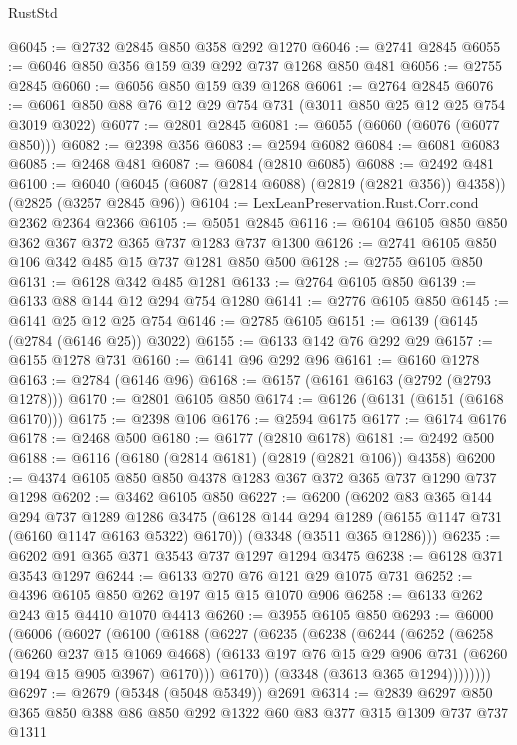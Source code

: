 \begin{lexlean}{RustStd}
\begin{coremodule}
@6045 := @2732 @2845 @850 @358 @292 @1270
@6046 := @2741 @2845
@6055 := @6046 @850 @356 @159 @39 @292 @737 @1268 @850 @481
@6056 := @2755 @2845
@6060 := @6056 @850 @159 @39 @1268
@6061 := @2764 @2845
@6076 := @6061 @850 @88 @76 @12 @29 @754 @731 (@3011 @850 @25 @12 @25 @754 @3019 @3022)
@6077 := @2801 @2845
@6081 := @6055 (@6060 (@6076 (@6077 @850)))
@6082 := @2398 @356
@6083 := @2594 @6082
@6084 := @6081 @6083
@6085 := @2468 @481
@6087 := @6084 (@2810 @6085)
@6088 := @2492 @481
@6100 := @6040 (@6045 (@6087 (@2814 @6088) (@2819 (@2821 @356)) @4358)) (@2825 (@3257 @2845 @96))
@6104 := LexLeanPreservation.Rust.Corr.cond @2362 @2364 @2366
@6105 := @5051 @2845
@6116 := @6104 @6105 @850 @850 @362 @367 @372 @365 @737 @1283 @737 @1300
@6126 := @2741 @6105 @850 @106 @342 @485 @15 @737 @1281 @850 @500
@6128 := @2755 @6105 @850
@6131 := @6128 @342 @485 @1281
@6133 := @2764 @6105 @850
@6139 := @6133 @88 @144 @12 @294 @754 @1280
@6141 := @2776 @6105 @850
@6145 := @6141 @25 @12 @25 @754
@6146 := @2785 @6105
@6151 := @6139 (@6145 (@2784 (@6146 @25)) @3022)
@6155 := @6133 @142 @76 @292 @29
@6157 := @6155 @1278 @731
@6160 := @6141 @96 @292 @96
@6161 := @6160 @1278
@6163 := @2784 (@6146 @96)
@6168 := @6157 (@6161 @6163 (@2792 (@2793 @1278)))
@6170 := @2801 @6105 @850
@6174 := @6126 (@6131 (@6151 (@6168 @6170)))
@6175 := @2398 @106
@6176 := @2594 @6175
@6177 := @6174 @6176
@6178 := @2468 @500
@6180 := @6177 (@2810 @6178)
@6181 := @2492 @500
@6188 := @6116 (@6180 (@2814 @6181) (@2819 (@2821 @106)) @4358)
@6200 := @4374 @6105 @850 @850 @4378 @1283 @367 @372 @365 @737 @1290 @737 @1298
@6202 := @3462 @6105 @850
@6227 := @6200
    (@6202
      @83
      @365
      @144
      @294
      @737
      @1289
      @1286
      @3475
      (@6128 @144 @294 @1289 (@6155 @1147 @731 (@6160 @1147 @6163 @5322) @6170))
      (@3348 (@3511 @365 @1286)))
@6235 := @6202 @91 @365 @371 @3543 @737 @1297 @1294 @3475
@6238 := @6128 @371 @3543 @1297
@6244 := @6133 @270 @76 @121 @29 @1075 @731
@6252 := @4396 @6105 @850 @262 @197 @15 @15 @1070 @906
@6258 := @6133 @262 @243 @15 @4410 @1070 @4413
@6260 := @3955 @6105 @850
@6293 := @6000
    (@6006
      (@6027
        (@6100
          (@6188
            (@6227
              (@6235
                (@6238
                  (@6244
                    (@6252
                      (@6258
                        (@6260 @237 @15 @1069 @4668)
                        (@6133 @197 @76 @15 @29 @906 @731 (@6260 @194 @15 @905 @3967) @6170)))
                    @6170))
                (@3348 (@3613 @365 @1294))))))))
@6297 := @2679 (@5348 (@5048 @5349)) @2691
@6314 := @2839 @6297 @850 @365 @850 @388 @86 @850 @292 @1322 @60 @83 @377 @315 @1309 @737 @737 @1311

\end{coremodule}
\end{lexlean}
